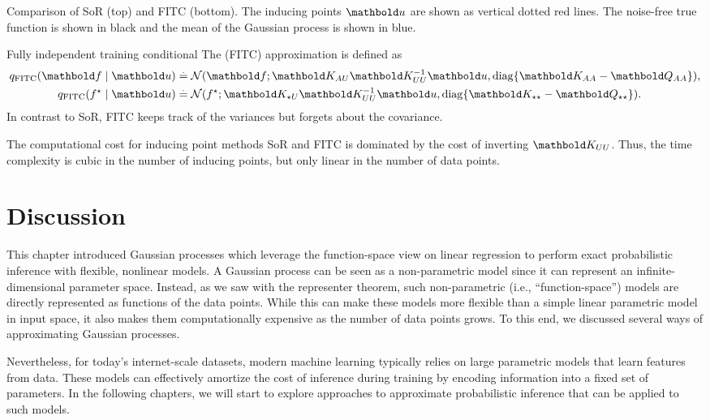 \begin{marginfigure}
  \caption{Comparison of SoR (top) and FITC (bottom).
  The inducing points $\vu$ are shown as vertical dotted red lines.
  The noise-free true function is shown in black and the mean of the Gaussian process is shown in blue.}
\end{marginfigure}

\begin{ex}{Fully independent training conditional}{}
  The  (FITC) approximation is defined as \begin{subequations}\begin{align}
    q_{\mathrm{FITC}}(\vf \mid \vu) &\defeq \N[\vf]{\mK_{\sA\sU} \inv{\mK_{\sU\sU}} \vu}{\diag{\mK_{\sA\sA} - \mQ_{\sA\sA}}}, \\
    q_{\mathrm{FITC}}(\fs \mid \vu) &\defeq \N[\fs]{\mK_{\star\sU} \inv{\mK_{\sU\sU}} \vu}{\diag{\mK_{\star\star} - \mQ_{\star\star}}}.
  \end{align}\end{subequations}
  In contrast to SoR, FITC keeps track of the variances but forgets about the covariance.
\end{ex}

The computational cost for inducing point methods SoR and FITC is dominated by the cost of inverting $\mK_{\sU\sU}$.
Thus, the time complexity is cubic in the number of inducing points, but only linear in the number of data points.

\section*{Discussion}

This chapter introduced Gaussian processes which leverage the function-space view on linear regression to perform exact probabilistic inference with flexible, nonlinear models.
A Gaussian process can be seen as a non-parametric model since it can represent an infinite-dimensional parameter space.
Instead, as we saw with the representer theorem, such non-parametric (i.e., ``function-space'') models are directly represented as functions of the data points.
While this can make these models more flexible than a simple linear parametric model in input space, it also makes them computationally expensive as the number of data points grows.
To this end, we discussed several ways of approximating Gaussian processes.

Nevertheless, for today's internet-scale datasets, modern machine learning typically relies on large parametric models that learn features from data.
These models can effectively amortize the cost of inference during training by encoding information into a fixed set of parameters.
In the following chapters, we will start to explore approaches to approximate probabilistic inference that can be applied to such models.

